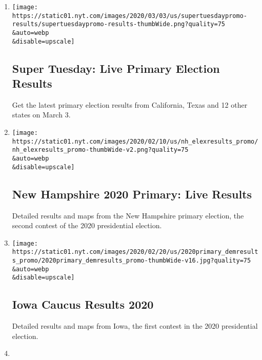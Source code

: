 \begin{enumerate}
\def\labelenumi{\arabic{enumi}.}
\item
  \href{/interactive/2020/03/03/us/elections/results-super-tuesday-primary-election.html}{}

  \texttt{[image: https://static01.nyt.com/images/2020/03/03/us/supertuesdaypromo-results/supertuesdaypromo-results-thumbWide.png?quality=75\\\&auto=webp\\\&disable=upscale]}

  \hypertarget{super-tuesday-live-primary-election-results}{%
  \subsection{Super Tuesday: Live Primary Election
  Results}\label{super-tuesday-live-primary-election-results}}

  Get the latest primary election results from California, Texas and 12
  other states on March 3.
\item
  \href{/interactive/2020/02/11/us/elections/results-new-hampshire-primary-election.html}{}

  \texttt{[image: https://static01.nyt.com/images/2020/02/10/us/nh\_elexresults\_promo/nh\_elexresults\_promo-thumbWide-v2.png?quality=75\\\&auto=webp\\\&disable=upscale]}

  \hypertarget{new-hampshire-2020-primary-live-results}{%
  \subsection{New Hampshire 2020 Primary: Live
  Results}\label{new-hampshire-2020-primary-live-results}}

  Detailed results and maps from the New Hampshire primary election, the
  second contest of the 2020 presidential election.
\item
  \href{/interactive/2020/02/04/us/elections/results-iowa-caucus.html}{}

  \texttt{[image: https://static01.nyt.com/images/2020/02/20/us/2020primary\_demresults\_promo/2020primary\_demresults\_promo-thumbWide-v16.jpg?quality=75\\\&auto=webp\\\&disable=upscale]}

  \hypertarget{iowa-caucus-results-2020}{%
  \subsection{Iowa Caucus Results 2020}\label{iowa-caucus-results-2020}}

  Detailed results and maps from Iowa, the first contest in the 2020
  presidential election.
\item
  \href{/interactive/2020/01/08/books/new-books-international.html}{}


\end{enumerate}
